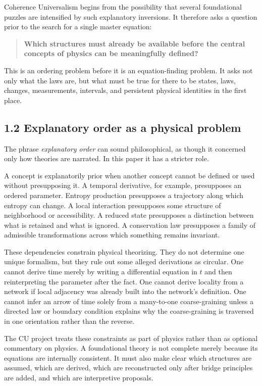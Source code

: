 \documentclass[
  11pt,
]{article}
\begin{document}
Coherence Universalism begins from the possibility that several
foundational puzzles are intensified by such explanatory inversions. It
therefore asks a question prior to the search for a single master
equation:

\begin{quote}
\textbf{Which structures must already be available before the central
concepts of physics can be meaningfully defined?}
\end{quote}

This is an ordering problem before it is an equation-finding problem. It
asks not only what the laws are, but what must be true for there to be
states, laws, changes, measurements, intervals, and persistent physical
identities in the first place.

\subsection{1.2 Explanatory order as a physical
problem}\label{explanatory-order-as-a-physical-problem}

The phrase \emph{explanatory order} can sound philosophical, as though
it concerned only how theories are narrated. In this paper it has a
stricter role.

A concept is explanatorily prior when another concept cannot be defined
or used without presupposing it. A temporal derivative, for example,
presupposes an ordered parameter. Entropy production presupposes a
trajectory along which entropy can change. A local interaction
presupposes some structure of neighborhood or accessibility. A reduced
state presupposes a distinction between what is retained and what is
ignored. A conservation law presupposes a family of admissible
transformations across which something remains invariant.

These dependencies constrain physical theorizing. They do not determine
one unique formalism, but they rule out some alleged derivations as
circular. One cannot derive time merely by writing a differential
equation in \(t\) and then reinterpreting the parameter after the fact.
One cannot derive locality from a network if local adjacency was already
built into the network's definition. One cannot infer an arrow of time
solely from a many-to-one coarse-graining unless a directed law or
boundary condition explains why the coarse-graining is traversed in one
orientation rather than the reverse.

The CU project treats these constraints as part of physics rather than
as optional commentary on physics. A foundational theory is not complete
merely because its equations are internally consistent. It must also
make clear which structures are assumed, which are derived, which are
reconstructed only after bridge principles are added, and which are
interpretive proposals.
\end{document}
